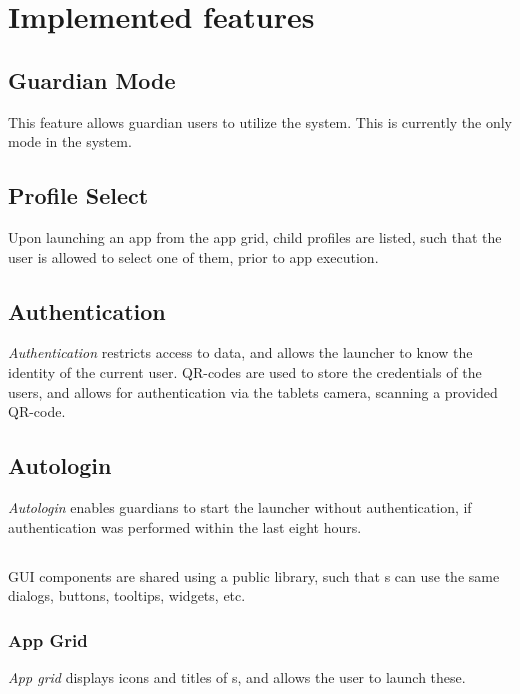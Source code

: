 \section{Implemented features}
\label{backlog_implemented}

\subsection{Guardian Mode}
\label{backlog:guardian_mode}
This feature allows guardian users to utilize the \giraf[] system. 
This is currently the only mode in the system.

%
\subsection{Profile Select}
\label{backlog:profile_select}
Upon launching an app from the app grid, child profiles are listed, such that the user is allowed to select one of them, prior to app execution.

%
\subsection{Authentication}
\label{backlog:authentication}
\emph{Authentication} restricts access to data, and allows the launcher to know the identity of the current user.
QR-codes are used to store the credentials of the users, and allows for authentication via the tablets camera, scanning a provided QR-code.

\subsection{Autologin}
\label{backlog:autologin}
\emph{Autologin} enables guardians to start the launcher without authentication, if authentication was performed within the last eight hours.

%
\subsection{\guicomponents[]}
\label{backlog:GUI_components}
GUI components are shared using a public library, such that \girafapp[]s can use the same dialogs, buttons, tooltips, widgets, etc.

\subsubsection{App Grid}
\label{backlog:appgrid}
\emph{App grid} displays icons and titles of \girafapp[]s, and allows the user to launch these.

